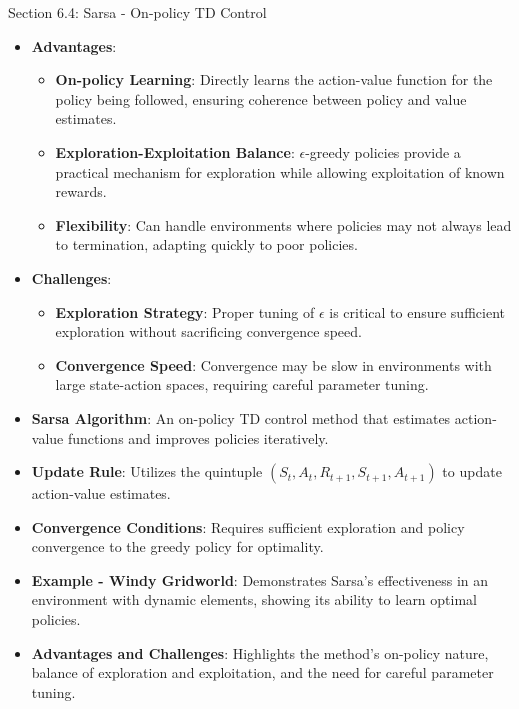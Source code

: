 \begin{notes}{Section 6.4: Sarsa - On-policy TD Control}
\begin{highlight}
        \begin{itemize}
            \item \textbf{Advantages}:
                \begin{itemize}
                    \item \textbf{On-policy Learning}: Directly learns the action-value function for the policy being followed, ensuring coherence between policy and value estimates.
                    \item \textbf{Exploration-Exploitation Balance}: $\epsilon$-greedy policies provide a practical mechanism for exploration while allowing exploitation of known rewards.
                    \item \textbf{Flexibility}: Can handle environments where policies may not always lead to termination, adapting quickly to poor policies.
                \end{itemize}
            \item \textbf{Challenges}:
                \begin{itemize}
                    \item \textbf{Exploration Strategy}: Proper tuning of $\epsilon$ is critical to ensure sufficient exploration without sacrificing convergence speed.
                    \item \textbf{Convergence Speed}: Convergence may be slow in environments with large state-action spaces, requiring careful parameter tuning.
                \end{itemize}
        \end{itemize}
    
    \end{highlight}
    
    \begin{highlight}
    
        \begin{itemize}
            \item \textbf{Sarsa Algorithm}: An on-policy TD control method that estimates action-value functions and improves policies iteratively.
            \item \textbf{Update Rule}: Utilizes the quintuple $(S_t, A_t, R_{t+1}, S_{t+1}, A_{t+1})$ to update action-value estimates.
            \item \textbf{Convergence Conditions}: Requires sufficient exploration and policy convergence to the greedy policy for optimality.
            \item \textbf{Example - Windy Gridworld}: Demonstrates Sarsa's effectiveness in an environment with dynamic elements, showing its ability to learn optimal policies.
            \item \textbf{Advantages and Challenges}: Highlights the method's on-policy nature, balance of exploration and exploitation, and the need for careful parameter tuning.
        \end{itemize}
    

\end{highlight}
\end{notes}
